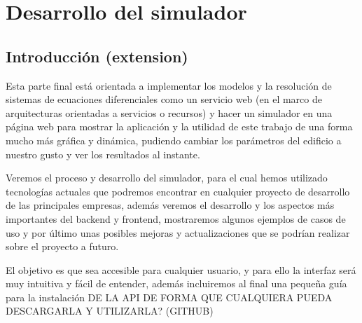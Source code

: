 \chapter{Desarrollo del simulador}
\section{Introducción (extension)}
Esta parte final está orientada a implementar los modelos y la resolución de sistemas de ecuaciones diferenciales como un servicio web (en el marco de arquitecturas orientadas a servicios o recursos) y hacer un simulador en una página web para mostrar la aplicación y la utilidad de este trabajo de una forma mucho más gráfica y dinámica, pudiendo cambiar los parámetros del edificio a nuestro gusto y ver los resultados al instante.

Veremos el proceso y desarrollo del simulador, para el cual hemos utilizado tecnologías actuales que podremos encontrar en cualquier proyecto de desarrollo de las principales empresas, además veremos el desarrollo y los aspectos más importantes del backend y frontend, mostraremos algunos ejemplos de casos de uso y por último unas posibles mejoras y actualizaciones que se podrían realizar sobre el proyecto a futuro.

El objetivo es que sea accesible para cualquier usuario, y para ello la interfaz será muy intuitiva y fácil de entender, además incluiremos al final una pequeña guía para la instalación DE LA API DE FORMA QUE CUALQUIERA PUEDA DESCARGARLA Y UTILIZARLA? (GITHUB)
